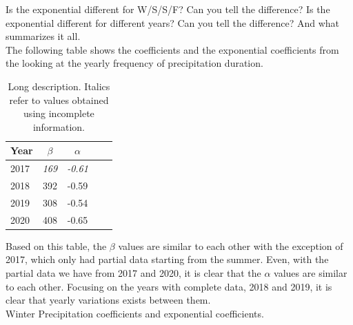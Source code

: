 \documentclass[11pt]{report}
\begin{document}
Is the exponential different for W/S/S/F? Can you tell the difference?
Is the exponential different for different years? Can you tell the
difference?  And what summarizes it all. \\ The following table shows
the coefficients and the exponential coefficients from the looking at
the yearly frequency of precipitation duration. \\
\begin{table}
\begin{center}
	\begin{tabular}{l*{3}{c}r}
		\centering
		Year      & $\beta $ & $\alpha$  \\
		\hline
		2017      & \textit{169}           & \textit{-0.61}   \\
		2018      & 392           & -0.59    \\
		2019      & 308           & -0.54   \\
		2020      & 408           & -0.65    \\
	\end{tabular}
\end{center}
\caption[Short title]{Long description. Italics refer to values
  obtained using incomplete information. }
\end{table}
Based on this table, the $\beta$ values are similar to each other with
the exception of 2017, which only had partial data starting from the
summer. Even, with the partial data we have from 2017 and 2020, it is
clear that the $\alpha$ values are similar to each other. Focusing on
the years with complete data, 2018 and 2019, it is clear that yearly
variations exists between them.  \\ Winter Precipitation coefficients
and exponential coefficients. \\
\end{document}
